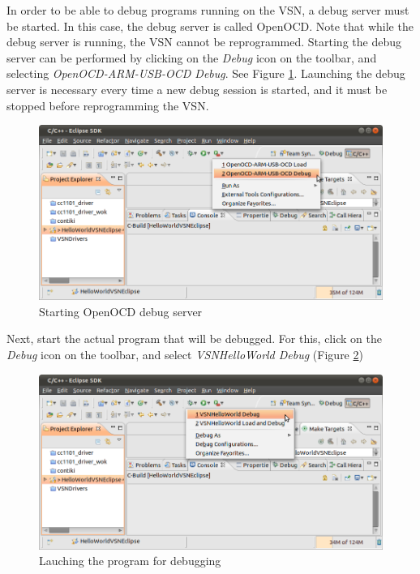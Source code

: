 \documentclass[a4paper, 10pt]{article}
\begin{document}
In order to be able to debug programs running on the VSN,
a debug server must be started.
In this case, the debug server is called OpenOCD.
Note that while the debug server is running, the VSN cannot be reprogrammed.
Starting the debug server can be performed by clicking on the
\emph{Debug} icon on the toolbar, and selecting
\emph{OpenOCD-ARM-USB-OCD Debug}.
See Figure \ref{fig:debug-openocd-start}.
Launching the debug server is necessary every time a new debug session is started,
and it must be stopped before reprogramming the VSN.

    \begin{figure}[H]
    \centering
        \includegraphics[width=\textwidth]{./png-install-guide/debug-openocd-start.png}
        \caption{Starting OpenOCD debug server}
        \label{fig:debug-openocd-start}
    \end{figure}

Next, start the actual program that will be debugged.
For this, click on the \emph{Debug} icon on the toolbar, and select
\emph{VSNHelloWorld Debug}
(Figure \ref{fig:debug-launch})

    \begin{figure}[H]
    \centering
        \includegraphics[width=\textwidth]{./png-install-guide/debug-launch.png}
        \caption{Lauching the program for debugging}
        \label{fig:debug-launch}
    \end{figure}
\end{document}
